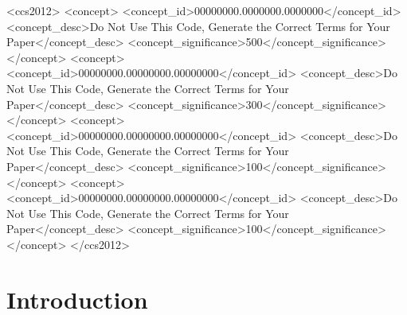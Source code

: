 \documentclass[manuscript,review,anonymous]{acmart}
\begin{document}
\begin{CCSXML}
<ccs2012>
 <concept>
  <concept_id>00000000.0000000.0000000</concept_id>
  <concept_desc>Do Not Use This Code, Generate the Correct Terms for Your Paper</concept_desc>
  <concept_significance>500</concept_significance>
 </concept>
 <concept>
  <concept_id>00000000.00000000.00000000</concept_id>
  <concept_desc>Do Not Use This Code, Generate the Correct Terms for Your Paper</concept_desc>
  <concept_significance>300</concept_significance>
 </concept>
 <concept>
  <concept_id>00000000.00000000.00000000</concept_id>
  <concept_desc>Do Not Use This Code, Generate the Correct Terms for Your Paper</concept_desc>
  <concept_significance>100</concept_significance>
 </concept>
 <concept>
  <concept_id>00000000.00000000.00000000</concept_id>
  <concept_desc>Do Not Use This Code, Generate the Correct Terms for Your Paper</concept_desc>
  <concept_significance>100</concept_significance>
 </concept>
</ccs2012>
\end{CCSXML}




\maketitle

\section{Introduction}\label{intro}
	
\end{document}
